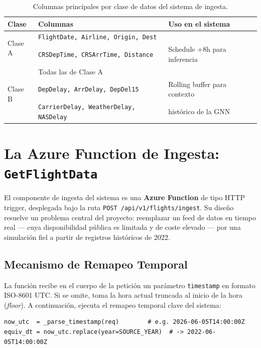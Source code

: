 \documentclass[12pt,oneside,a4paper]{report}
\renewcommand{\_}{\textunderscore\allowbreak}
\begin{document}
\begin{table}[h!]
\centering
\caption{Columnas principales por clase de datos del sistema de ingesta.}
\label{tab:columnas_clases}
\begin{tabular}{@{}lll@{}}
\toprule
\textbf{Clase} & \textbf{Columnas} & \textbf{Uso en el sistema} \\
\midrule
\multirow{2}{*}{Clase A} & \texttt{FlightDate, Airline, Origin, Dest} & \\
                         & \texttt{CRSDepTime, CRSArrTime, Distance} & Schedule +8h para inferencia \\
\midrule
\multirow{3}{*}{Clase B} & Todas las de Clase A & \\
                         & \texttt{DepDelay, ArrDelay, DepDel15} & Rolling buffer para contexto \\
                         & \texttt{CarrierDelay, WeatherDelay, NASDelay} & histórico de la GNN \\
\bottomrule
\end{tabular}
\end{table}

\section{La Azure Function de Ingesta: \texttt{GetFlightData}}
\label{sec:azure_function}

El componente de ingesta del sistema es una \textbf{Azure Function} de tipo HTTP trigger, desplegada bajo la ruta \texttt{POST /api/v1/flights/ingest}. Su diseño resuelve un problema central del proyecto: reemplazar un feed de datos en tiempo real --- cuya disponibilidad pública es limitada y de coste elevado --- por una simulación fiel a partir de registros históricos de 2022.

\subsection{Mecanismo de Remapeo Temporal}
\label{sub:remapeo_temporal}

La función recibe en el cuerpo de la petición un parámetro \texttt{timestamp} en formato ISO-8601 UTC. Si se omite, toma la hora actual truncada al inicio de la hora (\textit{floor}). A continuación, ejecuta el remapeo temporal clave del sistema:

\begin{lstlisting}[style=pystyle, caption={Remapeo del timestamp actual al año histórico 2022.}]
now_utc  = _parse_timestamp(req)        # e.g. 2026-06-05T14:00:00Z
equiv_dt = now_utc.replace(year=SOURCE_YEAR)  # -> 2022-06-05T14:00:00Z
\end{lstlisting}
\end{document}

